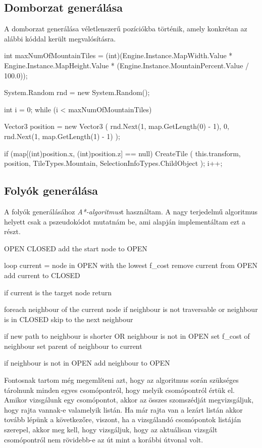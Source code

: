 \subsection{Domborzat generálása}

A domborzat generálása véletlenszerű pozíciókba történik, amely konkrétan az alábbi kóddal került megvalósításra.
\begin{cpp}
int maxNumOfMountainTiles = 
(int)(Engine.Instance.MapWidth.Value * Engine.Instance.MapHeight.Value * 
(Engine.Instance.MountainPercent.Value / 100.0));

System.Random rnd = new System.Random();

int i = 0;
while (i < maxNumOfMountainTiles)
{
   Vector3 position = new Vector3
   (
      rnd.Next(1, map.GetLength(0) - 1),
      0, rnd.Next(1, map.GetLength(1) - 1)
   );

   if (map[(int)position.x, (int)position.z] == null)
   {
      CreateTile
      (
         this.transform, position, TileTypes.Mountain, 
         SelectionInfoTypes.ChildObject
      );
      i++;
   }
}
\end{cpp}

\subsection{Folyók generálása}
\cite{A*Code}

A folyók generálásához \textit{A*-algoritmus}t használtam. A nagy terjedelmű algoritmus helyett csak a pszeudokódot mutatnám be, ami alapján implementáltam ezt a részt.
\begin{cpp}
OPEN 
CLOSED 
add the start node to OPEN

loop
   current = node in OPEN  with the lowest f_cost
   remove current from OPEN
   add current to CLOSED

   if current is the target node
      return

   foreach neighbour of the current node
      if neighbour is not traversable or neighbour is in CLOSED
         skip to the next neighbour

      if new path to neighbour is shorter OR neighbour is not in OPEN
         set f_cost of neighbour
         set parent of neighbour to current
         
         if neighbour is not in OPEN
            add neighbour to OPEN
\end{cpp}

Fontosnak tartom még megemlíteni azt, hogy az algoritmus során szükséges tárolnunk minden egyes csomópontról, hogy melyik csomópontról értük el. Amikor vizsgálunk egy csomópontot, akkor az összes szomszédját megvizsgáljuk, hogy rajta vannak-e valamelyik listán. Ha már rajta van a lezárt listán akkor tovább lépünk a következőre, viszont, ha a vizsgálandó csomópontok listáján szerepel, akkor meg kell, hogy vizsgáljuk, hogy az aktuálisan vizsgált csomópontról nem rövidebb-e az út mint a korábbi útvonal volt.

